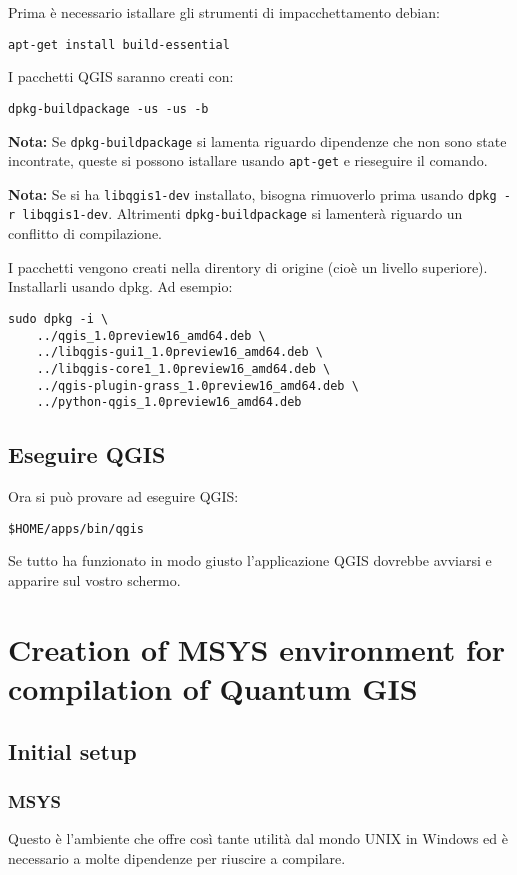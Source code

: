 Prima è necessario istallare gli strumenti di impacchettamento debian:

\begin{verbatim}
apt-get install build-essential
\end{verbatim}

I pacchetti QGIS saranno creati con:

\begin{verbatim}
dpkg-buildpackage -us -us -b
\end{verbatim}

\textbf{Nota:} Se \texttt{dpkg-buildpackage} si lamenta riguardo dipendenze che non sono state incontrate, queste si possono istallare usando \texttt{apt-get} e rieseguire il comando.

\textbf{Nota:} Se si ha \texttt{libqgis1-dev} installato, bisogna rimuoverlo prima usando \texttt{dpkg -r libqgis1-dev}.  Altrimenti \texttt{dpkg-buildpackage} si lamenterà riguardo un conflitto di compilazione.

I pacchetti vengono creati nella direntory di origine (cioè un livello superiore).
Installarli usando dpkg.  Ad esempio:

\begin{verbatim}
sudo dpkg -i \
	../qgis_1.0preview16_amd64.deb \
	../libqgis-gui1_1.0preview16_amd64.deb \
	../libqgis-core1_1.0preview16_amd64.deb \
	../qgis-plugin-grass_1.0preview16_amd64.deb \
	../python-qgis_1.0preview16_amd64.deb
\end{verbatim}

\subsection{Eseguire QGIS}
Ora si può provare ad eseguire QGIS:

\begin{verbatim}
$HOME/apps/bin/qgis 
\end{verbatim}

Se tutto ha funzionato in modo giusto l'applicazione QGIS dovrebbe avviarsi e apparire sul vostro schermo.

\section{Creation of MSYS environment for compilation of Quantum GIS}
\subsection{Initial setup}
\subsubsection{MSYS}
Questo è l'ambiente che offre così tante utilità dal mondo UNIX in Windows ed è necessario a molte dipendenze per riuscire a compilare.


